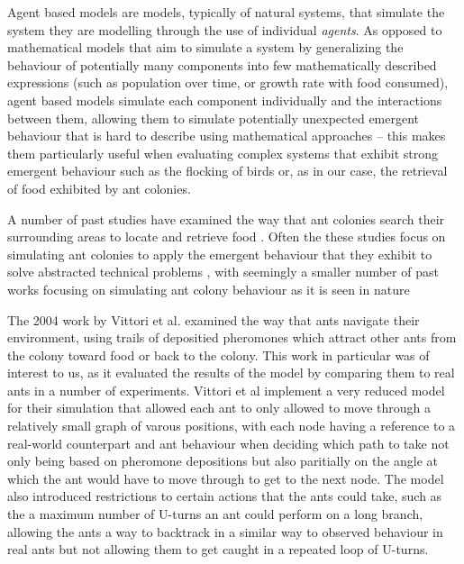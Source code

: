 
    Agent based models are models, typically of natural systems, that simulate the system they are modelling through the use of individual \textit{agents}. As opposed to mathematical models that aim to simulate
    a system by generalizing the behaviour of potentially many components into few mathematically described expressions (such as population over time, or growth rate with food consumed), agent based models simulate
    each component individually and the interactions between them\cite{8}, allowing them to simulate potentially unexpected emergent behaviour that is hard to describe using mathematical approaches -- this makes them
    particularly useful when evaluating complex systems that exhibit strong emergent behaviour such as the flocking of birds or, as in our case, the retrieval of food exhibited by ant colonies.
    
    A number of past studies have examined the way that ant colonies search their surrounding areas to locate and retrieve food \cite{vittori_modeling_2004, a_panait_ant_2004}.
    Often the these studies focus on simulating ant colonies to apply the emergent behaviour that they exhibit to solve abstracted technical
    problems \cite{dorigo_ant_2006, zhang_improved_2007}, with seemingly a smaller number of past works focusing on simulating ant colony behaviour as it is seen in nature \cite{vittori_modeling_2004} %
    

    The 2004 work by Vittori et al.\cite{vittori_modeling_2004} examined the way that ants navigate their environment, using trails of depositied pheromones which attract other ants from the colony toward food or back
    to the colony. This work in particular was of interest to us, as it evaluated the results of the model by comparing them to real ants in a number of experiments. Vittori et al implement a very reduced model for
    their simulation that allowed each ant to only allowed to move through a relatively small graph of varous positions, with each node having a reference to a real-world counterpart and ant behaviour when deciding
    which path to take not only being based on pheromone depositions but also paritially on the angle at which the ant would have to move through to get to the next node. The model also introduced restrictions to
    certain actions that the ants could take, such as the a maximum number of U-turns an ant could perform on a long branch, allowing the ants a way to backtrack in a similar way to observed behaviour in real ants but
    not allowing them to get caught in a repeated loop of U-turns.

